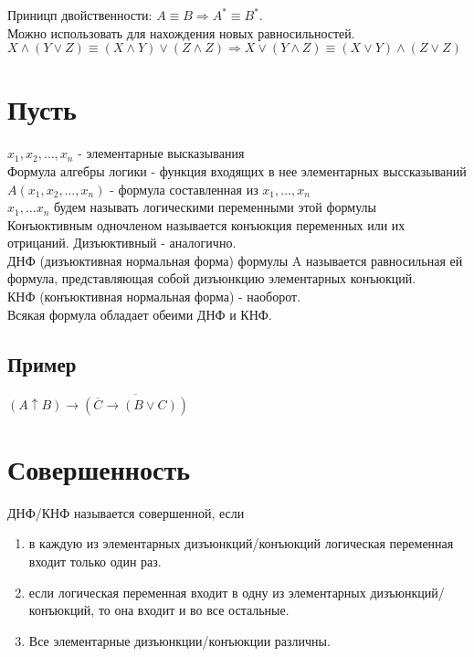 \documentclass[letterpaper]{article}
\begin{document}
Приницп двойственности: \(A \equiv B \Rightarrow A^* \equiv B^*\).\\

Можно использовать для нахождения новых равносильностей.\\

\(X \land (Y \lor Z) \equiv (X \land Y) \lor (Z \land Z) \Rightarrow X \lor (Y \land Z) \equiv (X \lor Y) \land (Z \lor Z)\)\\
\section{Пусть}
\label{sec:org8901531}
\(x_1, x_2, \ldots, x_n\) - элементарные высказывания\\

Формула алгебры логики - функция входящих в нее элементарных выссказываний\\

\(A(x_1, x_2, \ldots, x_n)\) - формула составленная из \(x_1, \ldots, x_n\)\\

\(x_1, \ldots x_n\) будем называть логическими переменными этой формулы\\

Конъюктивным одночленом называется конъюкция переменных или их отрицаний. Дизъюктивный - аналогично.\\

ДНФ (дизъюктивная нормальная форма) формулы A называется равносильная ей формула, представляющая собой дизъюнкцию элементарных конъюкций.\\

КНФ (конъюктивная нормальная форма) - наоборот.\\

Всякая формула обладает обеими ДНФ и КНФ.\\
\subsection{Пример}
\label{sec:org6863180}
\((A \uparrow B) \rightarrow \overline{(\overline{C} \rightarrow (B \lor C))}\)\\
\section{Совершенность}
\label{sec:orgc35284b}
ДНФ/КНФ называется совершенной, если\\
\begin{enumerate}
\item в каждую из элементарных дизъюнкций/конъюкций логическая переменная входит только один раз.\\
\item если логическая переменная входит в одну из элементарных дизъюнкций/конъюкций, то она входит и во все остальные.\\
\item Все элементарные дизъюнкции/конъюкции различны.\\
\end{enumerate}
\end{document}
